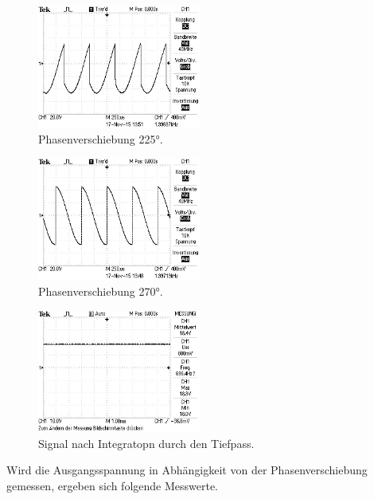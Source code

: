 \begin{figure}
  \centering
  \includegraphics[width=0.48\textwidth]{bilder/Ohne Rauschen/4.JPG}
  \caption{Phasenverschiebung 225°.}
  \label{fig:bild4}
\end{figure}

\begin{figure}
  \centering
  \includegraphics[width=0.48\textwidth]{bilder/Ohne Rauschen/5.JPG}
  \caption{Phasenverschiebung 270°.}
  \label{fig:bild5}
\end{figure}

\begin{figure}
  \centering
  \includegraphics[width=0.48\textwidth]{bilder/Ohne Rauschen/6.JPG}
  \caption{Signal nach Integratopn durch den Tiefpass.}
  \label{fig:bild6}
\end{figure}

Wird die Ausgangsspannung in Abhängigkeit von der Phasenverschiebung gemessen, ergeben sich folgende Messwerte.

